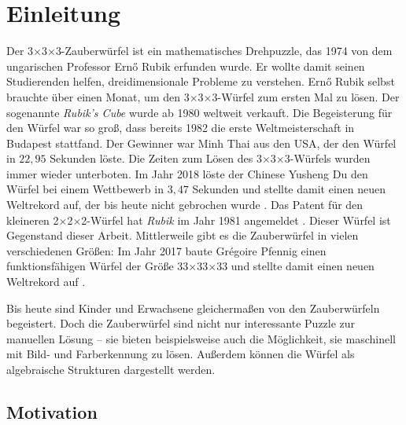 \documentclass[12pt,a4paper, usenames, dvipsnames]{article}
\theoremstyle{mystyle}
\theoremstyle{definition}
\newcommand{\Ttwo}{2$\times$2$\times$2-}
\newcommand{\Tthree}{3$\times$3$\times$3-}
\begin{document}
\section{Einleitung}

\label{Kapitel_Einleitung}

Der \Tthree Zauberwürfel ist ein mathematisches Drehpuzzle, das 1974 von dem ungarischen Professor Ern\H{o} Rubik erfunden wurde. Er wollte damit seinen Studierenden helfen, dreidimensionale Probleme zu verstehen. Ern\H{o} Rubik selbst brauchte über einen Monat, um den \Tthree Würfel zum ersten Mal zu lösen.
Der sogenannte \textit{Rubik's Cube} wurde ab 1980 weltweit verkauft. Die Begeisterung für den Würfel war so groß, dass bereits 1982 die erste Weltmeisterschaft in Budapest stattfand. Der Gewinner war Minh Thai aus den USA, der den Würfel in $22,95$ Sekunden löste. \cite{RC} Die Zeiten zum Lösen des \Tthree Würfels wurden immer wieder unterboten.
Im Jahr 2018 löste der Chinese Yusheng Du den Würfel bei einem Wettbewerb in $3,47$ Sekunden und stellte damit einen neuen Weltrekord auf, der bis heute nicht gebrochen wurde \cite{rekord}.
Das Patent für den kleineren \Ttwo Würfel hat \textit{Rubik} im Jahr 1981 angemeldet \cite{patent}. Dieser Würfel ist Gegenstand dieser Arbeit. Mittlerweile gibt es die Zauberwürfel in vielen verschiedenen Größen: Im Jahr 2017 baute Grégoire Pfennig einen funktionsfähigen Würfel der Größe 33$\times$33$\times$33 und stellte damit einen neuen Weltrekord auf \cite{HugeCube}.

Bis heute sind Kinder und Erwachsene gleichermaßen von den Zauberwürfeln begeistert.
Doch die Zauberwürfel sind nicht nur interessante Puzzle zur manuellen Lösung -- sie bieten beispielsweise auch die Möglichkeit, sie maschinell mit Bild- und Farberkennung zu lösen. Außerdem können die Würfel als algebraische Strukturen dargestellt werden.

%
%
%
%
%
%
%
%
\subsection{Motivation} 
\end{document}
